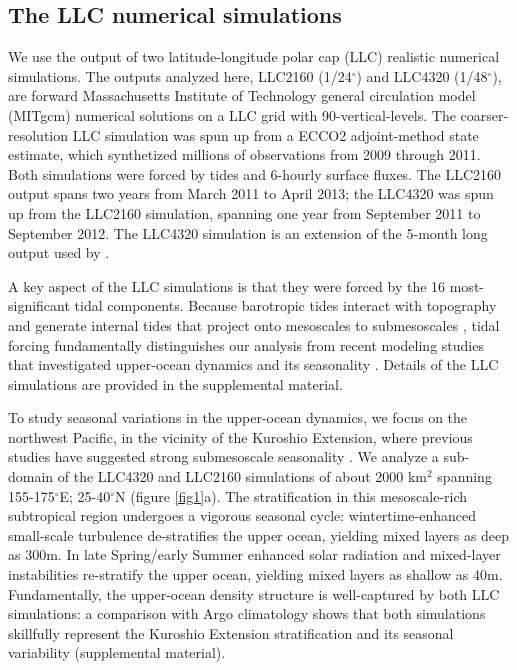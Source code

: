 \documentclass[grl]{agutex2015}
\begin{document}
\begin{article}
\section{The LLC numerical simulations}
We use the output of two latitude-longitude polar cap (LLC)
realistic numerical simulations. The outputs
analyzed here, LLC2160 (1/24$^\circ$) and LLC4320 (1/48$^\circ$),   are
forward Massachusetts Institute of Technology general circulation model (MITgcm)
numerical solutions on a LLC grid  \citep{forget_etal2015} with
90-vertical-levels. The coarser-resolution LLC simulation was
spun up from a ECCO2 adjoint-method state estimate, which synthetized millions
of observations from 2009 through 2011. Both simulations were forced by
tides and 6-hourly surface fluxes. The LLC2160
output spans two years from March 2011 to April 2013; the LLC4320 was spun up from
the LLC2160 simulation, spanning one year from September 2011 to September 2012.
The LLC4320 simulation is an extension of the 5-month long output used by
\citet{rocha_etal2016}.

A key aspect of the LLC simulations is that they were forced by
the 16 most-significant tidal components.
Because barotropic tides interact with topography and generate internal
tides that project onto mesoscales to submesoscales
\citep[e.g., ][]{rocha_etal2016}, tidal forcing fundamentally distinguishes our analysis
from recent modeling studies that investigated upper-ocean dynamics
and its seasonality \citep{sasaki_etal2014,qiu_etal2014}. Details of the LLC simulations
are provided in the supplemental material.

To study seasonal variations in the upper-ocean dynamics, we focus on the northwest
Pacific, in the vicinity of the Kuroshio
Extension, where previous studies have suggested strong submesoscale seasonality
\citep{sasaki_etal2014,qiu_etal2014}.
We analyze a sub-domain of the LLC4320 and LLC2160 simulations of about 2000 km$^2$
spanning 155-175$^\circ$E; 25-40$^\circ$N (figure \ref{fig1}a). The stratification
in this mesoscale-rich subtropical region undergoes a vigorous seasonal cycle: wintertime-enhanced
small-scale turbulence de-stratifies the upper ocean, yielding mixed layers
as deep as 300m. In late Spring/early Summer enhanced solar radiation and mixed-layer
instabilities re-stratify the upper ocean, yielding mixed layers as shallow as 40m.
Fundamentally, the upper-ocean density structure is well-captured by both LLC simulations:
a comparison with Argo climatology shows that both simulations skillfully represent the Kuroshio
Extension stratification and its seasonal variability  (supplemental material).


\end{article}
\end{document}
